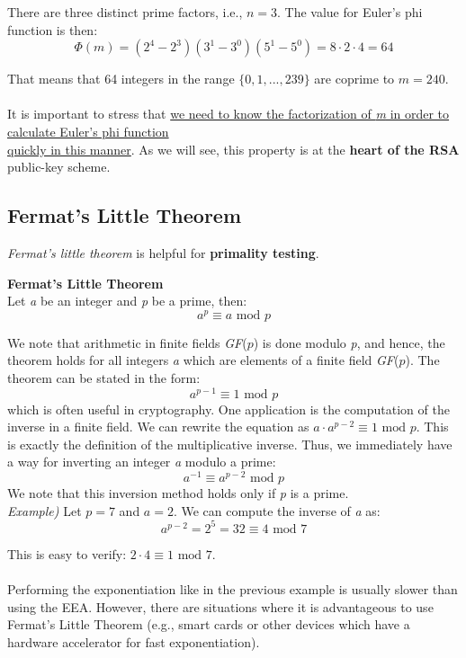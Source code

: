 \documentclass[11pt, a4paper]{article}
\newcommand{\gf}[1]{\textit{GF}(#1)}
\newcommand{\mymod}{
    \text{ mod }
}
\begin{document}
There are three distinct prime factors, i.e., $n=3$. The value for Euler's phi function is then:
$$\Phi(m)=(2^4-2^3)(3^1-3^0)(5^1-5^0)=8\cdot2\cdot4=64$$

That means that 64 integers in the range $\{0,1,...,239\}$ are coprime to $m=240$.\\\\
It is important to stress that \underline{we need to know the factorization of \textit{m} in order to calculate Euler's phi function}\\\underline{quickly in this manner}. As we will see, this property is at the \textbf{heart of the RSA} public-key scheme.

\subsection{Fermat's Little Theorem}
\textit{Fermat's little theorem} is helpful for \textbf{primality testing}.
\begin{center}\begin{framed}
    \textbf{Fermat's Little Theorem}\\
    Let \textit{a} be an integer and \textit{p} be a prime, then:
    $$a^p\equiv a\mymod p$$
\end{framed}\end{center}
We note that arithmetic in finite fields \gf{$p$} is done modulo \textit{p}, and hence, the theorem holds for all integers \textit{a} which are elements of a finite field \gf{$p$}. The theorem can be stated in the form:
$$a^{p-1}\equiv1\mymod p$$
which is often useful in cryptography. One application is the computation of the inverse in a finite field. We can rewrite the equation as $a\cdot a^{p-2}\equiv1\mymod p$. This is exactly the definition of the multiplicative inverse. Thus, we immediately have a way for inverting an integer \textit{a} modulo a prime:
$$a^{-1}\equiv a^{p-2}\mymod p$$
We note that this inversion method holds only if \textit{p} is a prime.\\

\textit{Example)} Let $p=7$ and $a=2$. We can compute the inverse of \textit{a} as:
$$a^{p-2}=2^5=32\equiv 4\mymod7$$

This is easy to verify: $2\cdot4\equiv1\mymod7$.\\\\
Performing the exponentiation like in the previous example is usually slower than using the EEA. However, there are situations where it is advantageous to use Fermat's Little Theorem (e.g., smart cards or other devices which have a hardware accelerator for fast exponentiation).
\end{document}
